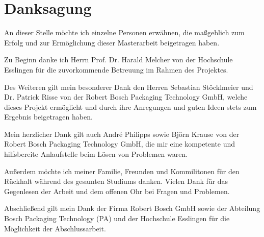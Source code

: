 \chapter*{Danksagung}
\thispagestyle{empty}

An dieser Stelle möchte ich einzelne Personen erwähnen, die maßgeblich zum Erfolg und zur Ermöglichung dieser
Masterarbeit beigetragen haben.

Zu Beginn danke ich Herrn Prof. Dr. Harald Melcher von der Hochschule Esslingen für die zuvorkommende Betreuung im
Rahmen des Projektes.

Des Weiteren gilt mein besonderer Dank den Herren Sebastian Stöcklmeier und Dr. Patrick Risse von der Robert Bosch
Packaging Technology GmbH, welche dieses Projekt ermöglicht und durch ihre Anregungen und guten Ideen stets zum Ergebnis
beigetragen haben.

Mein herzlicher Dank gilt auch André Philipps sowie Björn Krause von der Robert Bosch Packaging Technology GmbH, die mir
eine kompetente und hilfsbereite Anlaufstelle beim Lösen von Problemen waren.

Außerdem möchte ich meiner Familie, Freunden und Kommilitonen für den Rückhalt während des gesamten Studiums danken.
Vielen Dank für das Gegenlesen der Arbeit und dem offenen Ohr bei Fragen und Problemen.

Abschließend gilt mein Dank der Firma Robert Bosch GmbH sowie der Abteilung Bosch Packaging Technology (PA) und der
Hochschule Esslingen für die Möglichkeit der Abschlussarbeit.